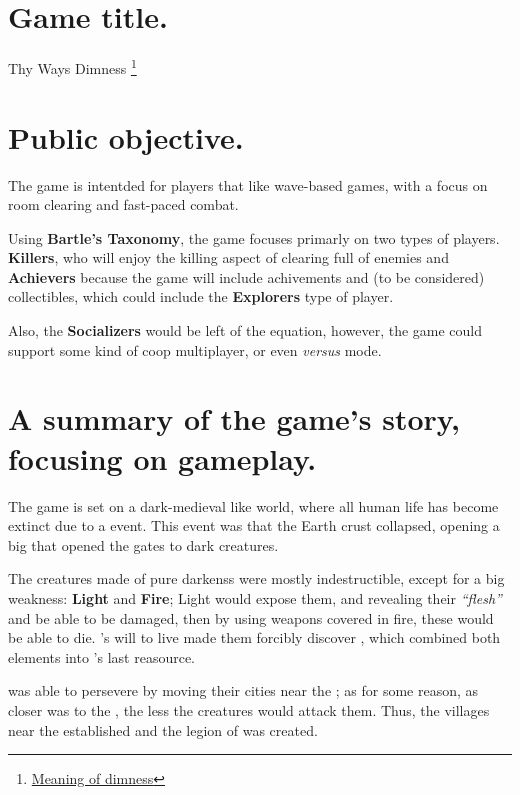 \section{Game title.}
Thy Ways Dimness \footnote{\href{https://dictionary.cambridge.org/es/diccionario/ingles/dimness}{Meaning of dimness}}


\section{Public objective.}
The game is intentded for players that like wave-based games, with a focus on room clearing and fast-paced combat.

Using \textbf{Bartle's Taxonomy}, the game focuses primarly on two types of players. \textbf{Killers}, who will enjoy the killing aspect of clearing full of enemies and \textbf{Achievers} because the game will include achivements and (to be considered) collectibles, which could include the \textbf{Explorers} type of player.

Also, the \textbf{Socializers} would be left of the equation, however, the game could support some kind of coop multiplayer, or even \textit{versus} mode.


\section{A summary of the game's story, focusing on gameplay.}
The game is set on a dark-medieval like world, where all human life has become extinct due to a event. This event was that the Earth crust collapsed, opening a big \hole that opened the gates to dark creatures.

The creatures made of pure darkenss were mostly indestructible, except for a big weakness: \textbf{Light} and \textbf{Fire}; Light would expose them, and revealing their \textit{“flesh”} and be able to be damaged, then by using weapons covered in fire, these would be able to die. \humanity's will to live made them forcibly discover \gunpowder, which combined both elements into \humanity's last reasource.

\humanity was able to persevere by moving their cities near the \hole; as for some reason, as closer \humanity was to the \hole, the less the creatures would attack them. Thus, the villages near the \hole established and the legion of \hunters was created.

